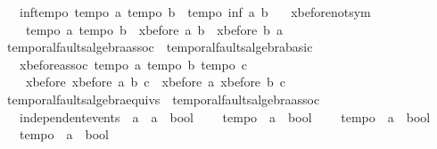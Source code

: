 \begin{isabellebody}
\ \ \ inf{\isacharunderscore}tempo{}{\isacharcolon}\ {\isachardoublequoteopen}{\isasymlbrakk}tempo{}\ a{\isacharsemicolon}\ tempo{}\ b{\isasymrbrakk}\ {\isasymLongrightarrow}\ tempo{}\ {\isacharparenleft}inf\ a\ b{\isacharparenright}{\isachardoublequoteclose}\isanewline
\ \ \ xbefore{\isacharunderscore}not{\isacharunderscore}sym{\isacharcolon}\ \isanewline
\ \ \ \ {\isachardoublequoteopen}{\isasymlbrakk}tempo{}\ a{\isacharsemicolon}\ tempo{}\ b{\isasymrbrakk}\ {\isasymLongrightarrow}\ {\isacharparenleft}xbefore\ a\ b{\isacharparenright}\ {\isasymle}\ {\isacharminus}{\isacharparenleft}xbefore\ b\ a{\isacharparenright}{\isachardoublequoteclose}%
\isamarkuptrue%
\isamarkupfalse%
\ temporal{\isacharunderscore}faults{\isacharunderscore}algebra{\isacharunderscore}assoc\ {\isacharequal}\ temporal{\isacharunderscore}faults{\isacharunderscore}algebra{\isacharunderscore}basic\ {\isacharplus}\isanewline
\ \ \ xbefore{\isacharunderscore}assoc{\isacharcolon}\ {\isachardoublequoteopen}{\isasymlbrakk}tempo{}\ a{\isacharsemicolon}\ tempo{}\ b{\isacharsemicolon}\ tempo{}\ c{\isasymrbrakk}\ {\isasymLongrightarrow}\ \isanewline
\ \ \ \ xbefore\ {\isacharparenleft}xbefore\ a\ b{\isacharparenright}\ c\ {\isacharequal}\ xbefore\ a\ {\isacharparenleft}xbefore\ b\ c{\isacharparenright}{\isachardoublequoteclose}%
\isamarkuptrue%
\isamarkupfalse%
\ temporal{\isacharunderscore}faults{\isacharunderscore}algebra{\isacharunderscore}equivs\ {\isacharequal}\ temporal{\isacharunderscore}faults{\isacharunderscore}algebra{\isacharunderscore}assoc\ {\isacharplus}\isanewline
\ \ \ independent{\isacharunderscore}events\ {\isacharcolon}{\isacharcolon}\ {\isachardoublequoteopen}{\isacharprime}a\ {\isasymRightarrow}\ {\isacharprime}a\ {\isasymRightarrow}\ bool{\isachardoublequoteclose}\ \isanewline
\ \ \ tempo{}\ {\isacharcolon}{\isacharcolon}\ {\isachardoublequoteopen}{\isacharprime}a\ {\isasymRightarrow}\ bool{\isachardoublequoteclose}\ \isanewline
\ \ \ tempo{}\ {\isacharcolon}{\isacharcolon}\ {\isachardoublequoteopen}{\isacharprime}a\ {\isasymRightarrow}\ bool{\isachardoublequoteclose}\ \isanewline
\ \ \ tempo{}\ {\isacharcolon}{\isacharcolon}\ {\isachardoublequoteopen}{\isacharprime}a\ {\isasymRightarrow}\ bool{\isachardoublequoteclose}\ \isanewline

\end{isabellebody}
